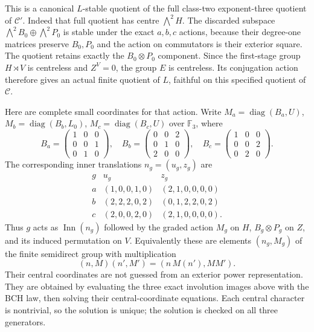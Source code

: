 This is a canonical $L$-stable quotient of the full
class-two exponent-three quotient of $\mathcal C'$.
Indeed that full quotient has centre $\bigwedge^2H$.
The discarded subspace
$\bigwedge^2B_0\oplus\bigwedge^2P_0$ is stable under
the exact $a,b,c$ actions, because their degree-one
matrices preserve $B_0,P_0$ and the action on commutators
is their exterior square. The quotient retains exactly
the $B_0\otimes P_0$ component. Since the first-stage
group $H\rtimes V$ is centreless and $Z^V=0$, the group
$E$ is centreless. Its conjugation action therefore gives
an actual finite quotient of $L$, faithful on this
specified quotient of $\mathcal C$.

Here are complete small coordinates for that action.
Write $M_a=\operatorname{diag}(B_a,U)$,
$M_b=\operatorname{diag}(B_b,L_0)$,
$M_c=\operatorname{diag}(B_c,U)$ over $\mathbb F_3$, where
\[
 B_a=\begin{pmatrix}1&0&0\\0&0&1\\0&1&0\end{pmatrix},
 \quad
 B_b=\begin{pmatrix}0&0&2\\0&1&0\\2&0&0\end{pmatrix},
 \quad
 B_c=\begin{pmatrix}1&0&0\\0&0&2\\0&2&0\end{pmatrix}.
\]
The corresponding inner translations $n_g=(u_g,z_g)$
are
\[
\begin{array}{c|c|c}
g&u_g&z_g\\ \hline
a&(1,0,0,1,0)&(2,1,0,0,0,0)\\
b&(2,2,2,0,2)&(0,1,2,2,0,2)\\
c&(2,0,0,2,0)&(2,1,0,0,0,0).
\end{array}
\]
Thus $g$ acts as $\operatorname{Inn}(n_g)$ followed by
the graded action $M_g$ on $H$, $B_g\otimes P_g$ on
$Z$, and its induced permutation on $V$.
Equivalently these are elements $(n_g,M_g)$ of the finite
semidirect group with multiplication
\[
       (n,M)(n',M')=(n\,M(n'),MM').
\]
Their central coordinates are not guessed from an exterior
power representation. They are obtained by evaluating
the three exact involution images above with the BCH law,
then solving their central-coordinate equations. Each
central character is nontrivial, so the solution is unique;
the solution is checked on all three generators.

